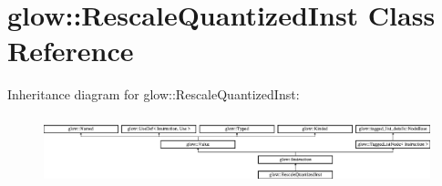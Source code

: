 \hypertarget{classglow_1_1_rescale_quantized_inst}{}\section{glow\+:\+:Rescale\+Quantized\+Inst Class Reference}
\label{classglow_1_1_rescale_quantized_inst}
Inheritance diagram for glow\+:\+:Rescale\+Quantized\+Inst\+:\begin{figure}[H]
\begin{center}
\leavevmode
\includegraphics[height=1.991111cm]{classglow_1_1_rescale_quantized_inst}
\end{center}
\end{figure}
